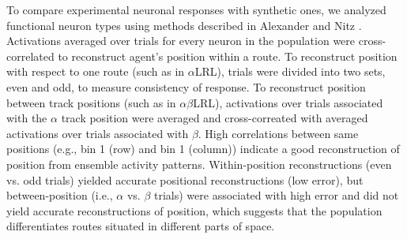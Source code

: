 To compare experimental neuronal responses with synthetic ones, we analyzed functional neuron types using methods described in Alexander and Nitz \citep{AlexanderNitz2015}. Activations averaged over trials for every neuron in the population were cross-correlated to reconstruct agent’s position within a route. To reconstruct position with respect to one route (such as in $\alpha$LRL), trials were divided into two sets, even and odd, to measure consistency of response. To reconstruct position between track positions (such as in $\alpha$$\beta$LRL), activations over trials associated with the $\alpha$ track position were averaged and cross-correated with averaged activations over trials associated with $\beta$. High correlations between same positions (e.g., bin 1 (row) and bin 1 (column)) indicate a good reconstruction of position from ensemble activity patterns. Within-position reconstructions (even vs. odd trials) yielded accurate positional reconstructions (low error), but between-position (i.e., $\alpha$ vs. $\beta$ trials) were associated with high error and did not yield accurate reconstructions of position, which suggests that the population differentiates routes situated in different parts of space.



